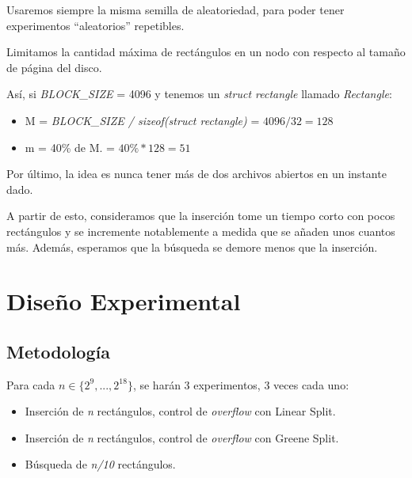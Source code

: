 \documentclass[letterpaper,10pt]{article}
\begin{document}
	Usaremos siempre la misma semilla de aleatoriedad, para poder tener experimentos ``aleatorios'' repetibles.

	Limitamos la cantidad máxima de rectángulos en un nodo con respecto al tamaño de página del disco.

	Así, si \textit{BLOCK\_SIZE} = 4096 y tenemos un \textit{struct rectangle} llamado \textit{Rectangle}:

	\begin{itemize}
		\item M = \textit{BLOCK\_SIZE / sizeof(struct rectangle)} = $ 4096 / 32 = 128 $
		\item m = 40\% de M. = $ 40\% * 128 = 51 $
	\end{itemize}

	Por último, la idea es nunca tener más de dos archivos abiertos en un instante dado.

	A partir de esto, consideramos que la inserción tome un tiempo corto con pocos rectángulos y se incremente notablemente a medida que se añaden unos cuantos más.
	Además, esperamos que la búsqueda se demore menos que la inserción.

	\newpage

	\section{Diseño Experimental}

	\subsection{Metodología}

	Para cada $n \in \{2^{9}, ..., 2^{18}\}$, se harán 3 experimentos, 3 veces cada uno:

	\begin{itemize}
		\item Inserción de \textit{n} rectángulos, control de \textit{overflow} con Linear Split.
		\item Inserción de \textit{n} rectángulos, control de \textit{overflow} con Greene Split.
		\item Búsqueda de \textit{n/10} rectángulos.
	\end{itemize}
\end{document}
